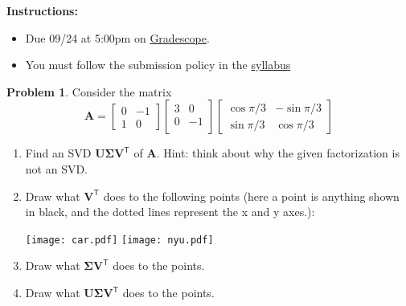 \documentclass[12pt]{article}
\theoremstyle{definition}
\newtheorem{problem}{Problem}
\renewcommand{\vec}{\mathbf}
\newcommand{\T}{\mathsf{T}}
\begin{document}
\textbf{\Large{}}
    
    \vspace{-1.8em}
    \hrulefill
 
\textbf{Instructions:}
    \begin{itemize}
        \item Due 09/24 at 5:00pm on \href{https://www.gradescope.com/courses/818054}{Gradescope}.
        \item You must follow the submission policy in the \href{https://courses.chen.pw/na_f2024/syllabus.html}{syllabus} 
\end{itemize}

\vspace{5em}



\begin{problem}
Consider the matrix 
    \[
        \vec{A} 
        = 
        \begin{bmatrix}
            0 & -1 \\
            1 & 0
        \end{bmatrix}
        \begin{bmatrix}
            3 & 0 \\ 0 & -1 \\
        \end{bmatrix}
        \begin{bmatrix}
            \cos \pi/3 & -\sin \pi/3 \\
            \sin \pi/3 & \cos \pi/3
        \end{bmatrix}
    \]
    \begin{enumerate}
        \item Find an SVD $\vec{U}\vec{\Sigma}\vec{V}^\T$ of $\vec{A}$. Hint: think about why the given factorization is not an SVD.
        \item Draw what $\vec{V}^\T$ does to the following points (here a point is anything shown in black, and the dotted lines represent the x and y axes.):
            
        \texttt{[image: car.pdf]}
        \hfill
        \texttt{[image: nyu.pdf]}
    
        \item Draw what $\vec{\Sigma}\vec{V}^\T$ does to the points.
        \item Draw what $\vec{U}\vec{\Sigma}\vec{V}^\T$ does to the points.
    \end{enumerate}

\end{problem}
\end{document}
